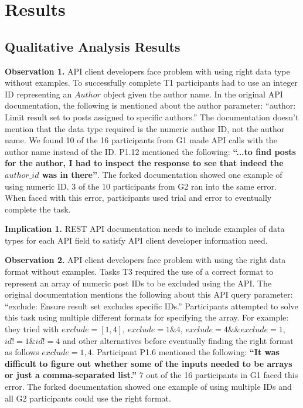 \documentclass[conference]{IEEEtran}
\begin{document}
\section{Results}

\subsection{Qualitative Analysis Results} %

\textbf{Observation 1.} API client developers face problem with using right data type without examples. To successfully complete T1 participants had to use an integer ID representing an $Author$ object given the author name. In the original API documentation, the following is mentioned about the author parameter: ``author: Limit result set to posts assigned to specific authors.'' The documentation doesn't mention that the data type required is the numeric author ID, not the author name. We found 10 of the 16 participants from G1 made API calls with the author name instead of the ID. P1.12 mentioned the following: \textbf{``...to find posts for the author, I had to inspect the response to see that indeed the $author\_id$ was in there''}. The forked documentation showed one example of using numeric ID. 3 of the 10 participants from G2 ran into the same error. When faced with this error, participants used trial and error to eventually complete the task.

\textbf{Implication 1.} REST API documentation needs to include examples of data types for each API field to satisfy API client developer information need.

\textbf{Observation 2.} API client developers face problem with using the right data format without examples. Tasks T3 required the use of a correct format to represent an array of numeric post IDs to be excluded using the API. The original documentation mentions the following about this API query parameter: ``exclude: Ensure result set excludes specific IDs.'' Participants attempted to solve this task using multiple different formats for specifying the array. For example: they tried with $exclude=[1,4]$, $exclude=1\&4$, $exclude=4\&\&exclude=1$, $id!=1\&id!=4$ and other alternatives before eventually finding the right format as follows $exclude=1,4$. Participant P1.6 mentioned the following: \textbf{``It was difficult to figure out whether some of the inputs needed to be arrays or just a comma-separated list.''} 7 out of the 16 participants in G1 faced this error. The forked documentation showed one example of using multiple IDs and all G2 participants could use the right format.
\end{document}
